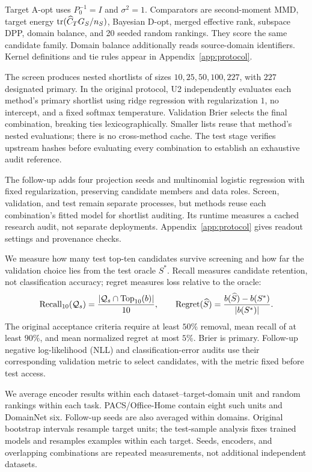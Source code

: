 Target A-opt uses $P_0^{-1}=I$ and $\sigma^2=1$. Comparators are second-moment MMD, target energy $\operatorname{tr}(\widehat C_TG_S/n_S)$, Bayesian D-opt, merged effective rank, subspace DPP, domain balance, and 20 seeded random rankings. They score the same candidate family. Domain balance additionally reads source-domain identifiers. Kernel definitions and tie rules appear in Appendix~\ref{app:protocol}.

The screen produces nested shortlists of sizes $10,25,50,100,227$, with $227$ designated primary. In the original protocol, U2 independently evaluates each method's primary shortlist using ridge regression with regularization $1$, no intercept, and a fixed softmax temperature. Validation Brier selects the final combination, breaking ties lexicographically. Smaller lists reuse that method's nested evaluations; there is no cross-method cache. The test stage verifies upstream hashes before evaluating every combination to establish an exhaustive audit reference.

The follow-up adds four projection seeds and multinomial logistic regression with fixed regularization, preserving candidate members and data roles. Screen, validation, and test remain separate processes, but methods reuse each combination's fitted model for shortlist auditing. Its runtime measures a cached research audit, not separate deployments. Appendix~\ref{app:protocol} gives readout settings and provenance checks.

We measure how many test top-ten candidates survive screening and how far the validation choice lies from the test oracle $S^*$. Recall measures candidate retention, not classification accuracy; regret measures loss relative to the oracle:
\begin{equation}
 \mathrm{Recall}_{10}(\mathcal{Q}_s)=\frac{|\mathcal{Q}_s\cap\mathrm{Top}_{10}(b)|}{10},\qquad
 \mathrm{Regret}(\widehat S)=\frac{b(\widehat S)-b(S^*)}{|b(S^*)|}.
 \label{eq:metrics}
\end{equation}
The original acceptance criteria require at least $50\%$ removal, mean recall of at least $90\%$, and mean normalized regret at most $5\%$. Brier is primary. Follow-up negative log-likelihood (NLL) and classification-error audits use their corresponding validation metric to select candidates, with the metric fixed before test access.

We average encoder results within each dataset--target-domain unit and random rankings within each task. PACS/Office-Home contain eight such units and DomainNet six. Follow-up seeds are also averaged within domains. Original bootstrap intervals resample target units; the test-sample analysis fixes trained models and resamples examples within each target. Seeds, encoders, and overlapping combinations are repeated measurements, not additional independent datasets.

